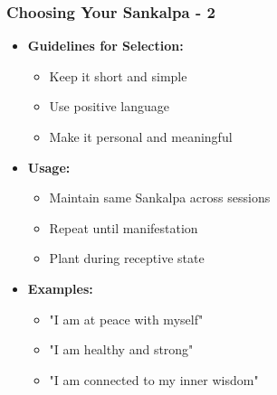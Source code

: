 \begin{frame}[fragile]\frametitle{Choosing Your Sankalpa - 2}
    \begin{itemize}
        \item \textbf{Guidelines for Selection:}
        \begin{itemize}
            \item Keep it short and simple
            \item Use positive language
            \item Make it personal and meaningful
        \end{itemize}
        \item \textbf{Usage:}
        \begin{itemize}
            \item Maintain same Sankalpa across sessions
            \item Repeat until manifestation
            \item Plant during receptive state
        \end{itemize}
        \item \textbf{Examples:}
        \begin{itemize}
            \item "I am at peace with myself"
            \item "I am healthy and strong"
            \item "I am connected to my inner wisdom"
        \end{itemize}
    \end{itemize}
\end{frame}

